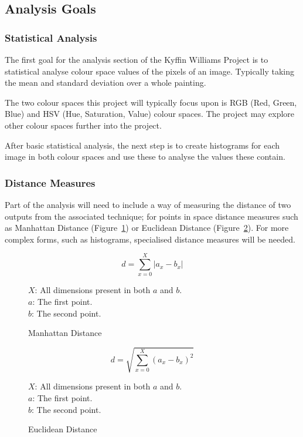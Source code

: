 \documentclass[11pt,fleqn,twoside]{article}
\begin{document}
\subsection{Analysis Goals}

\subsubsection{Statistical Analysis}
The first goal for the analysis section of the Kyffin Williams Project is to statistical analyse
colour space values of the pixels of an image. Typically taking the mean and standard deviation
over a whole painting.

The two colour spaces this project will typically focus upon is RGB (Red, Green, Blue) and HSV
(Hue, Saturation, Value) colour spaces. The project may explore other colour spaces further into 
the project.

After basic statistical analysis, the next step is to create histograms for each image in both 
colour spaces and use these to analyse the values these contain.

\subsubsection{Distance Measures}
Part of the analysis will need to include a way of measuring the distance of two outputs from the
associated technique; for points in space distance measures such as Manhattan Distance 
(Figure~\ref{eq:manhattan}) or Euclidean Distance (Figure~\ref{eq:euclidean}). For more complex
forms, such as histograms, specialised distance measures will be needed.

\begin{figure}[p]
\[
d = \sum^X_{x=0}{|a_x - b_x|}
\]

\(X\): All dimensions present in both \(a\) and \(b\).\\
\(a\): The first point.\\
\(b\): The second point.

\caption{Manhattan Distance}
\label{eq:manhattan}
\end{figure}

\begin{figure}[p]
\[
d = \sqrt{\sum^X_{x=0}{(a_x - b_x)^2}}
\]

\(X\): All dimensions present in both \(a\) and \(b\).\\
\(a\): The first point.\\
\(b\): The second point.
\caption{Euclidean Distance}
\label{eq:euclidean}
\end{figure}
\end{document}
